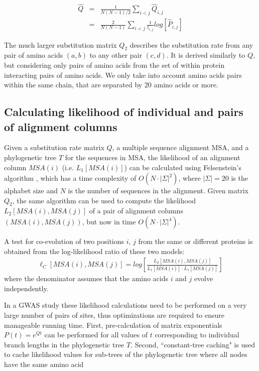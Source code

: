 \begin{eqnarray*}
	\hat{Q} & = & \frac{1}{N(N-1)/2} \sum_{i < j} \hat{Q}_{i,j} \\
	            & =  & \frac{2}{N(N-1)} \sum_{i<j} \frac{1}{t_{i,j}} log[ \hat{P}_{i,j} ]
\end{eqnarray*}

The much larger substitution matrix $Q_2$ describes the substitution rate from any pair of amino acids $(a,b)$ to any other pair $(c,d)$. 
It is derived similarly to $Q$, but considering only pairs of amino acids from the set of within protein interacting pairs of amino acids. 
We only take into account amino acids pairs within the same chain, that are separated by 20 amino acids or more. 

\subsection{Calculating likelihood of individual and pairs of alignment columns}

Given a substitution rate matrix $Q$, a multiple sequence alignment MSA, and a phylogenetic tree $T$ for the sequences in MSA, the likelihood of an alignment column $MSA(i)$ (i.e. $L_1[MSA(i)]$) can be calculated using Felsenstein's algorithm \cite{felsenstein2004inferring}, which has a time complexity of $O(N \cdot |\Sigma|^2)$, where $|\Sigma|=20$ is the alphabet size and $N$ is the number of sequences in the alignment. 
Given matrix $Q_2$, the same algorithm can be used to compute the likelihood $L_2[ MSA(i), MSA(j) ]$ of a pair of alignment columns $( MSA(i), MSA(j) )$, but now in time $O(N \cdot |\Sigma|^4)$. 

A test for co-evolution of two positions $i$, $j$ from the same or different proteins is obtained from the log-likelihood ratio of these two models: 
%
%
\begin{eqnarray}
    \ell_C[MSA(i), MSA(j)] = log \left[ \frac{L_2[ MSA(i), MSA(j) ]}{L_1[MSA(i)] \cdot L_1[MSA(j)]} \right]
\end{eqnarray}
\noindent where the denominator assumes that the amino acids $i$ and $j$ evolve independently. 

In a GWAS study these likelihood calculations need to be performed on a very large number of pairs of sites, thus optimizations are required to ensure manageable running time. 
First, pre-calculation of  matrix exponentials $P(t) = e^{Qt}$ can be performed for all values of $t$ corresponding to individual branch lengths in the phylogenetic tree $T$. 
Second, ``constant-tree caching" is used to cache likelihood values for sub-trees of the phylogenetic tree where all nodes have the same amino acid 

